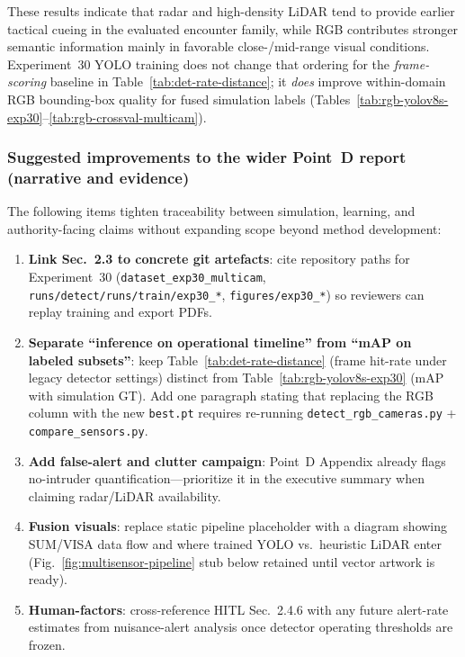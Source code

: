 These results indicate that radar and high-density LiDAR tend to provide earlier tactical cueing in the evaluated encounter family, while RGB contributes stronger semantic information mainly in favorable close-/mid-range visual conditions. Experiment~30 YOLO training does not change that ordering for the \emph{frame-scoring} baseline in Table~\ref{tab:det-rate-distance}; it \emph{does} improve within-domain RGB bounding-box quality for fused simulation labels (Tables~\ref{tab:rgb-yolov8s-exp30}--\ref{tab:rgb-crossval-multicam}).

\subsubsection{Suggested improvements to the wider Point~D report (narrative and evidence)}
\label{sec:report-improvements}
The following items tighten traceability between simulation, learning, and authority-facing claims without expanding scope beyond method development:
\begin{enumerate}
  \item \textbf{Link Sec.~2.3 to concrete git artefacts}: cite repository paths for Experiment~30 (\texttt{dataset\_exp30\_multicam}, \texttt{runs/detect/runs/train/exp30\_*}, \texttt{figures/exp30\_*}) so reviewers can replay training and export PDFs.
  \item \textbf{Separate ``inference on operational timeline'' from ``mAP on labeled subsets''}: keep Table~\ref{tab:det-rate-distance} (frame hit-rate under legacy detector settings) distinct from Table~\ref{tab:rgb-yolov8s-exp30} (mAP with simulation GT). Add one paragraph stating that replacing the RGB column with the new \texttt{best.pt} requires re-running \texttt{detect\_rgb\_cameras.py} + \texttt{compare\_sensors.py}.
  \item \textbf{Add false-alert and clutter campaign}: Point~D Appendix already flags no-intruder quantification---prioritize it in the executive summary when claiming radar/LiDAR availability.
  \item \textbf{Fusion visuals}: replace static pipeline placeholder with a diagram showing SUM/VISA data flow and where trained YOLO vs.\ heuristic LiDAR enter (Fig.~\ref{fig:multisensor-pipeline} stub below retained until vector artwork is ready).
  \item \textbf{Human-factors}: cross-reference HITL Sec.~2.4.6 with any future alert-rate estimates from nuisance-alert analysis once detector operating thresholds are frozen.
\end{enumerate}

